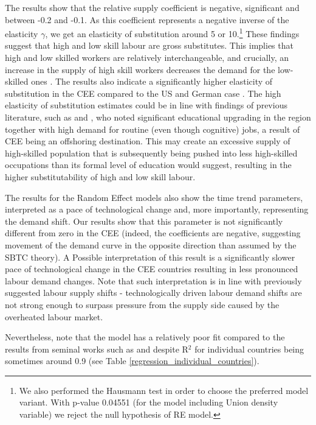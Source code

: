 \documentclass[11pt]{article}
\begin{document}
The results show that the relative supply coefficient is negative, significant and between -0.2 and -0.1. As this coefficient represents a negative inverse of the elasticity $\gamma$, we get an elasticity of substitution around 5 or 10.\footnote{We also performed the Hausmann test in order to choose the preferred model variant. With p-value 0.04551 (for the model including Union density variable) we reject the null hypothesis of RE model.} These findings suggest that high and low skill labour are gross substitutes. This implies that high and low skilled workers are relatively interchangeable, and crucially, an increase in the supply of high skill workers decreases the demand for the low-skilled ones \citep{havranek2020elasticity}. The results also indicate a significantly higher elasticity of substitution in the CEE compared to the US and German case \citep{acemoglu2012does, glitz2021skill}. The high elasticity of substitution estimates could be in line with findings of previous literature, such as \citet{arendt2019technical} and \citet{hardy2018educational}, who noted significant educational upgrading in the region together with high demand for routine (even though cognitive) jobs, a result of CEE being an offshoring destination. This may create an excessive supply of high-skilled population that is subsequently being pushed into less high-skilled occupations than its formal level of education would suggest, resulting in the higher substitutability of high and low skill labour.

The results for the Random Effect models also show the time trend parameters, interpreted as a pace of technological change and, more importantly, representing the demand shift. Our results show that this parameter is not significantly different from zero in the CEE (indeed, the coefficients are negative, suggesting movement of the demand curve in the opposite direction than assumed by the SBTC theory). A Possible interpretation of this result is a significantly slower pace of technological change in the CEE countries resulting in less pronounced labour demand changes. Note that such interpretation is in line with previously suggested labour supply shifts - technologically driven labour demand shifts are not strong enough to surpass pressure from the supply side caused by the overheated labour market.

Nevertheless, note that the model has a relatively poor fit compared to the results from seminal works such as \citet{katz1992changes} and \citet{glitz2021skill} despite R$^{2}$ for individual countries being sometimes around 0.9 (see Table \ref{regression_individual_countries}).
\end{document}
